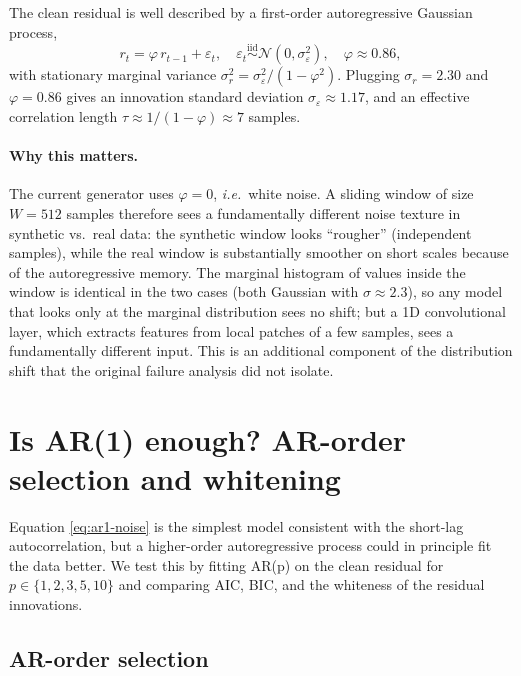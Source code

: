 The clean residual is well described by a first-order autoregressive
Gaussian process,
\begin{equation}
    r_t = \varphi\, r_{t-1} + \varepsilon_t,
    \quad \varepsilon_t \overset{\text{iid}}{\sim} \mathcal{N}(0, \sigma_\varepsilon^2),
    \quad \varphi \approx 0.86,
    \label{eq:ar1-noise}
\end{equation}
with stationary marginal variance
$\sigma_r^2 = \sigma_\varepsilon^2 / (1 - \varphi^2)$. Plugging
$\sigma_r = 2.30$ and $\varphi = 0.86$ gives an innovation standard
deviation $\sigma_\varepsilon \approx 1.17$, and an effective
correlation length $\tau \approx 1 / (1 - \varphi) \approx 7$ samples.

\paragraph{Why this matters.}
The current generator uses $\varphi = 0$, \emph{i.e.}\ white noise. A
sliding window of size $W = 512$ samples therefore sees a
fundamentally different noise texture in synthetic vs.\ real data:
the synthetic window looks ``rougher'' (independent samples), while
the real window is substantially smoother on short scales because of
the autoregressive memory. The marginal histogram of values inside
the window is identical in the two cases (both Gaussian with
$\sigma \approx 2.3$), so any model that looks only at the marginal
distribution sees no shift; but a 1D convolutional layer, which
extracts features from local patches of a few samples, sees a
fundamentally different input. This is an additional component of
the distribution shift that the original failure analysis did not
isolate.

\section{Is AR(1) enough? AR-order selection and whitening}
\label{sec:reanal-arorder}

Equation \cref{eq:ar1-noise} is the simplest model consistent with the
short-lag autocorrelation, but a higher-order autoregressive process
could in principle fit the data better. We test this by fitting
AR(p) on the clean residual for $p \in \{1, 2, 3, 5, 10\}$ and
comparing AIC, BIC, and the whiteness of the residual innovations.

\subsection{AR-order selection}

